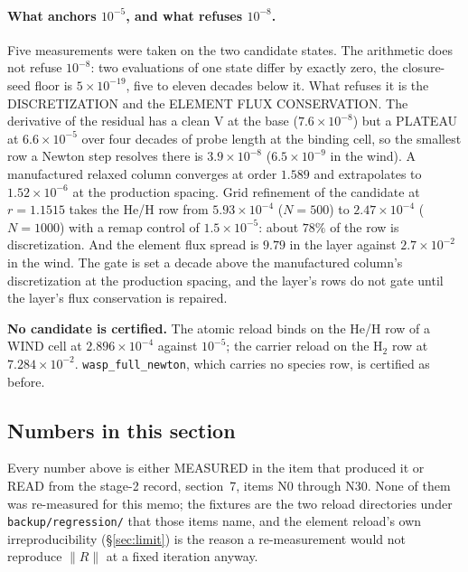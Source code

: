 \documentclass[english,a4paper]{my_memo}
\newcommand{\code}[1]{\texttt{#1}}
\begin{document}
\paragraph{What anchors $10^{-5}$, and what refuses $10^{-8}$.} Five
measurements were taken on the two candidate states. The arithmetic does not
refuse $10^{-8}$: two evaluations of one state differ by exactly zero, the
closure-seed floor is $5\times10^{-19}$, five to eleven decades below it.
What refuses it is the DISCRETIZATION and the ELEMENT FLUX CONSERVATION.
The derivative of the residual has a clean V at the base ($7.6\times10^{-8}$)
but a PLATEAU at $6.6\times10^{-5}$ over four decades of probe length at the
binding cell, so the smallest row a Newton step resolves there is
$3.9\times10^{-8}$ ($6.5\times10^{-9}$ in the wind). A manufactured relaxed
column converges at order $1.589$ and extrapolates to $1.52\times10^{-6}$ at
the production spacing. Grid refinement of the candidate at $r = 1.1515$ takes
the He/H row from $5.93\times10^{-4}$ ($N = 500$) to $2.47\times10^{-4}$
($N = 1000$) with a remap control of $1.5\times10^{-5}$: about $78\%$ of the
row is discretization. And the element flux spread is $9.79$ in the layer
against $2.7\times10^{-2}$ in the wind. The gate is set a decade above the
manufactured column's discretization at the production spacing, and the
layer's rows do not gate until the layer's flux conservation is repaired.

\textbf{No candidate is certified.} The atomic reload binds on the He/H row of
a WIND cell at $2.896\times10^{-4}$ against $10^{-5}$; the carrier reload on
the H$_2$ row at $7.284\times10^{-2}$. \code{wasp\_full\_newton}, which
carries no species row, is certified as before.

\subsection{Numbers in this section}

Every number above is either MEASURED in the item that produced it or READ
from the stage-2 record, section~7, items N0
through N30. None of them was
re-measured for this memo; the fixtures are the two reload directories under
\code{backup/regression/} that those items name, and the element reload's own
irreproducibility (\S\ref{sec:limit}) is the reason a re-measurement would
not reproduce $\|R\|$ at a fixed iteration anyway.
\end{document}
